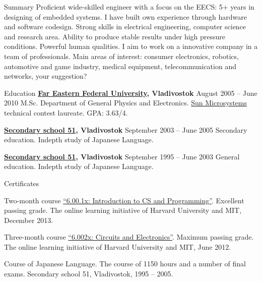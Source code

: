 \documentclass{template}
\begin{document}

\begin{rSection}{Summary}
Proficient wide-skilled engineer with a focus on the EECS: 5+ years in designing of embedded systems. I have built own experience through hardware and software codesign. Strong skills in electrical engineering, computer science and research area. Ability to produce stable results under high pressure conditions. Powerful human qualities. I aim to work on a innovative company in a team of professionals. Main areas of interest: consumer electronics, robotics, automotive and game industry, medical equipment, telecommunication and networks, your suggestion?
\end{rSection}


\begin{rSection}{Education}
{\bf \href{http://wwwold.dvfu.ru/en/web/fefu/}{Far Eastern Federal University}, Vladivostok} \hfill {August 2005 -- June 2010} \newline
M.Sc. Department of General Physics and Electronics. \newline
\href{http://www.oracle.com}{Sun Microsystems} technical contest laureate. \newline 
GPA: 3.63/4.

{\bf \href{http://www.school51.pupils.ru}{Secondary school 51}, Vladivostok} \hfill {September 2003 -- June 2005} \newline
Secondary education. \newline
Indepth study of Japanese Language.

{\bf \href{http://www.school51.pupils.ru}{Secondary school 51}, Vladivostok} \hfill {September 1995 -- June 2003} \newline
General education. \newline
Indepth study of Japanese Language.
\end{rSection}


\begin{rSection}{Certificates}
\begin{rItemize}
\item Two-month course \href{http://www.vova-ivanov.info/6.00.1x-Certificate.pdf}{\textquotedblleft 6.00.1x: Introduction to CS and Programming\textquotedblright}. Excellent passing grade. \newline
The online learning initiative of Harvard University and MIT, December 2013.
\item Three-month course \href{http://www.vova-ivanov.info/6.002x-Certificate.pdf}{\textquotedblleft 6.002x: Circuits and Electronics\textquotedblright}. Maximum passing grade. \newline
The online learning initiative of Harvard University and MIT, June 2012.
\item Course of Japanese Language. The course of 1150 hours and a number of final exams. \newline
Secondary school 51, Vladivostok, 1995 -- 2005.
\end{rItemize}
\end{rSection}
\end{document}
